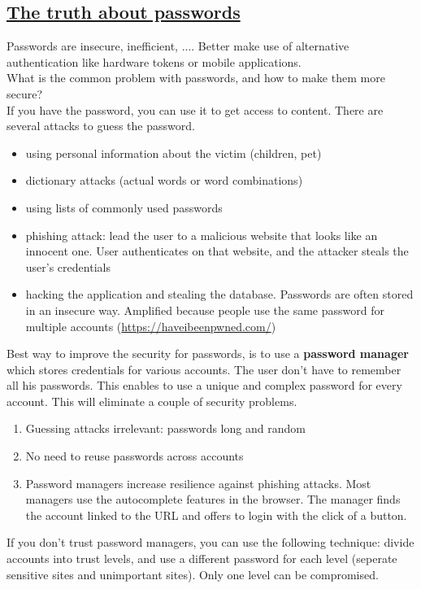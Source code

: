 \documentclass[titlepage]{article}
\begin{document}
    \subsection{\href{https://youtu.be/j-UczX60-L8}{The truth about passwords}}
    Passwords are insecure, inefficient, .... Better make use of alternative authentication like hardware tokens or mobile applications.\\
    What is the common problem with passwords, and how to make them more secure?\\
    If you have the password, you can use it to get access to content. There are several attacks to guess the password.
    \begin{itemize}
        \item using personal information about the victim (children, pet)
        \item dictionary attacks (actual words or word combinations)
        \item using lists of commonly used passwords
        \item phishing attack: lead the user to a malicious website that looks like an innocent one. User authenticates on that website, and the attacker steals the user's credentials
        \item hacking the application and stealing the database. Passwords are often stored in an insecure way. Amplified because people use the same password for multiple accounts (\url{https://haveibeenpwned.com/})
    \end{itemize}
    Best way to improve the security for passwords, is to use a \textbf{password manager} which stores credentials for various accounts. The user don't have to remember all his passwords. This enables to use a unique and complex password for every account. This will eliminate a couple of security problems.
    \begin{enumerate}
        \item Guessing attacks irrelevant: passwords long and random
        \item No need to reuse passwords across accounts
        \item Password managers increase resilience against phishing attacks. Most managers use the autocomplete features in the browser. The manager finds the account linked to the URL and offers to login with the click of a button.
    \end{enumerate}
    If you don't trust password managers, you can use the following technique: divide accounts into trust levels, and use a different password for each level (seperate sensitive sites and unimportant sites). Only one level can be compromised.
\end{document}
